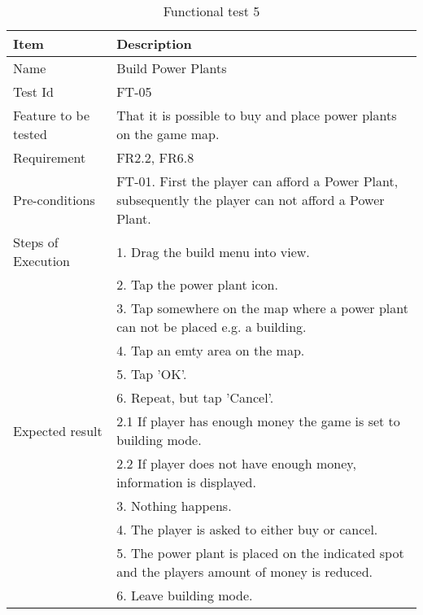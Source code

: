 \begin{table}[H]
\centering
	\begin{tabular}{ l | p{8cm} }
		\hline
		{\bf Item} & {\bf Description} \\ \hline
		Name & Build Power Plants \\ 
		Test Id & FT-05 \\ 
		Feature to be tested & That it is possible to buy and place power plants on the game map. \\ 
		Requirement & FR2.2, FR6.8 \\ 
		Pre-conditions & FT-01. First the player can afford a Power Plant, subsequently the player can not afford a Power Plant. \\
		Steps of Execution & 1. Drag the build menu into view. \\ 
		& 2. Tap the power plant icon. \\
		& 3. Tap somewhere on the map where a power plant can not be placed e.g. a building. \\
		& 4. Tap an emty area on the map. \\
		& 5. Tap 'OK'. \\
		& 6. Repeat, but tap 'Cancel'. \\
		Expected result & 2.1 If player has enough money the game is set to building mode. \\
		& 2.2 If player does not have enough money, information is displayed. \\
		& 3. Nothing happens. \\ 
		& 4. The player is asked to either buy or cancel. \\
		& 5. The power plant is placed on the indicated spot and the players amount of money is reduced. \\
		& 6. Leave building mode. \\
	\end{tabular}
	\caption{Functional test 5}
\end{table}

